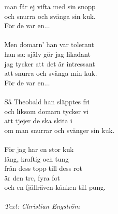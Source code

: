 man får ej vifta med sin snopp\\
och snurra och svänga sin kuk.\\
För de var en...\\
\\
Men domarn' han var tolerant\\
han sa: själv gör jag likadant\\
jag tycker att det är intressant\\
att snurra och svänga min kuk.\\
För de var en...\\
\\
Så Theobald han släpptes fri\\
och liksom domarn tycker vi\\
att tjejer de ska skita i\\
om man snurrar och svänger sin kuk.\\
\\
För jag har en stor kuk\\
lång, kraftig och tung\\
från dess topp till dess rot\\
är den tre, fyra fot\\
och en fjällräven-kånken till pung.\\
\\
{\footnotesize\textit{Text: Christian Engström}}
